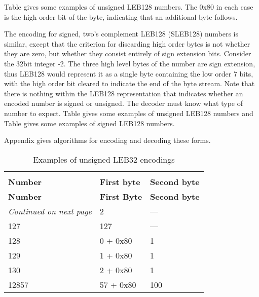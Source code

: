 Table 
gives some examples of unsigned LEB128 numbers. The
0x80 in each case is the high order bit of the byte, indicating
that an additional byte follows.


The encoding for signed, two’s complement LEB128 (SLEB128)
numbers is similar, except that the criterion for discarding
high order bytes is not whether they are zero, but whether
they consist entirely of sign extension bits. Consider the
32\dash bit integer -2. The three high level bytes of the number
are sign extension, thus LEB128 would represent it as a single
byte containing the low order 7 bits, with the high order
bit cleared to indicate the end of the byte stream. Note
that there is nothing within the LEB128 representation that
indicates whether an encoded number is signed or unsigned. The
decoder must know what type of number to expect. 
Table 
gives some examples of unsigned LEB128 numbers and 
Table 
gives some examples of signed LEB128 numbers.

Appendix  
gives algorithms for encoding and decoding these forms.


\begin{centering}
\setlength{\extrarowheight}{0.1cm}
\begin{longtable}{l|l|l}
  \caption{Examples of unsigned LEB32 encodings} \label{tab:examplesofunsignedleb128encodings} \\
  \hline \\ \bfseries Number&\bfseries First byte &\bfseries Second byte \\ \hline
\endfirsthead
  \bfseries Number&\bfseries First Byte &\bfseries Second byte\\ \hline
\endhead
  \hline \emph{Continued on next page}
\endfoot
  \hline
\endlastfoot
2&2& --- \\
127&127& ---\\
128& 0 + 0x80 & 1 \\
129& 1 + 0x80 & 1 \\
130& 2 + 0x80 & 1 \\
12857& 57 + 0x80 & 100 \\

\end{longtable}
\end{centering}



